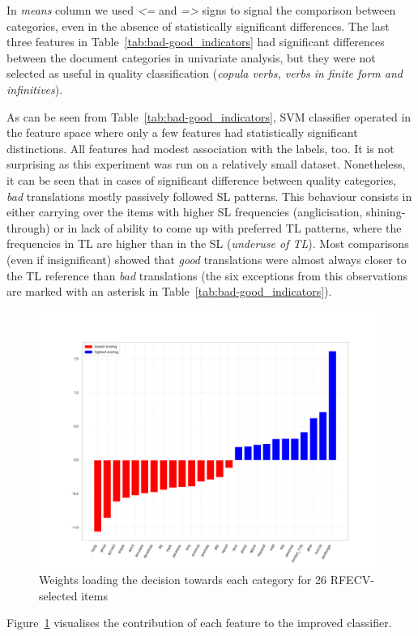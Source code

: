 In \textit{means} column we used \textit{<=} and \textit{=>} signs to signal the comparison between categories, even in the absence of statistically significant differences.
The last three features in Table~\ref{tab:bad-good_indicators} had significant differences between the document categories in univariate analysis, but they were not selected as useful in quality classification (\textit{copula verbs, verbs in finite form and infinitives}). 

As can be seen from Table~\ref{tab:bad-good_indicators}, SVM classifier operated in the feature space where only a few features had statistically significant distinctions. All features had modest association with the labels, too. It is not surprising as this experiment was run on a relatively small dataset.
Nonetheless, it can be seen that in cases of significant difference between quality categories, \textit{bad} translations mostly passively followed SL patterns. This behaviour consists in either carrying over the items with higher SL frequencies (anglicisation, shining-through) or in lack of ability to come up with preferred TL patterns, where the frequencies in TL are higher than in the SL (\textit{underuse of TL}). 
Most comparisons (even if insignificant) showed that \textit{good} translations were almost always closer to the TL reference than \textit{bad} translations (the six exceptions from this observations are marked with an asterisk in Table~\ref{tab:bad-good_indicators}).  
\vspace{-2em}
\begin{figure}[H]
	\centering
	\includegraphics[width=.85\linewidth]{figures/bad-good-bars-ud26}
	\caption{\label{fig:qua-weights}Weights loading the decision towards each category for 26 RFECV-selected items}	
\end{figure}
Figure~\ref{fig:qua-weights} visualises the contribution of each feature to the improved classifier. 

